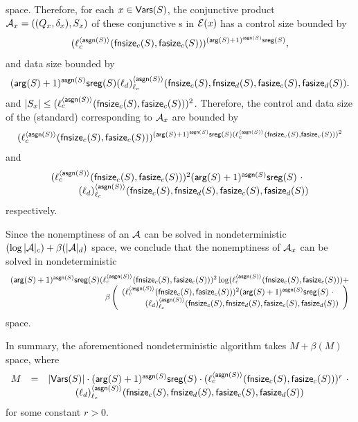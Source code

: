 \noindent space. 
Therefore, for each $x \in \mathsf{Vars}(S)$, the conjunctive product \SA{} $\mathcal{A}_x=((Q_x, \delta_x), S_x)$ of these conjunctive \SA{}s  in $\mathcal{E}(x)$ has a control size bounded by 
%
$$(\ell^{\langle \mathsf{asgn}(S) \rangle}_c(\mathsf{fnsize}_c(S), \mathsf{fasize}_c(S)))^{(\mathsf{arg}(S)+1)^{\mathsf{asgn}(S)} \mathsf{sreg}(S)},$$
%
and data size bounded by
%
\[ (\mathsf{arg}(S)+1)^{\mathsf{asgn}(S)} \mathsf{sreg}(S) (\ell_d)^{\langle  \mathsf{asgn}(S) \rangle}_{\ell_c}(\mathsf{fnsize}_c(S),\mathsf{fnsize}_d(S),  \mathsf{fasize}_c(S), \mathsf{fasize}_d(S)).\]
%
and $|S_x| \le (\ell_c^{\langle \mathsf{asgn}(S) \rangle}(\mathsf{fnsize}_c(S), \mathsf{fasize}_c(S)))^2$. 
Therefore, the control and data size of the (standard) \SA{} corresponding to $\mathcal{A}_x$ are  bounded by 
%
$$(\ell^{\langle \mathsf{asgn}(S) \rangle}_c(\mathsf{fnsize}_c(S), \mathsf{fasize}_c(S)))^{(\mathsf{arg}(S)+1)^{\mathsf{asgn}(S)} \mathsf{sreg}(S) (\ell_c^{\langle \mathsf{asgn}(S) \rangle}(\mathsf{fnsize}_c(S), \mathsf{fasize}_c(S)))^2}$$
%
and
$$
\begin{array}{l}
(\ell_c^{\langle \mathsf{asgn}(S) \rangle}(\mathsf{fnsize}_c(S), \mathsf{fasize}_c(S)))^2 (\mathsf{arg}(S)+1)^{\mathsf{asgn}(S)} \mathsf{sreg}(S)\ \cdot  \\
\hspace{1cm}(\ell_d)^{\langle  \mathsf{asgn}(S) \rangle}_{\ell_c}(\mathsf{fnsize}_c(S),\mathsf{fnsize}_d(S),  \mathsf{fasize}_c(S), \mathsf{fasize}_d(S))
\end{array}
$$
respectively.

Since the nonemptiness of an \SA{} $\mathcal{A}$ can be solved in nondeterministic $(\log |\mathcal{A}|_c) + \beta(|\mathcal{A}|_d)$ space, we conclude that the nonemptiness of $\mathcal{A}_x$ can be solved in nondeterministic 
{\small
$$
\begin{array}{l}
(\rcdim(S)+1)^{\rcdep(S)} \rcsreg(S) (\ell_c^{\langle \rcdep(S) \rangle}(\rcphi_c(S), \rcpsi_c(S)))^2 \log (\ell^{\langle \rcdep(S) \rangle}_c(\rcphi_c(S), \rcpsi_c(S)))+ \\
\hfill \beta
\left(
\begin{array}{l}
(\ell_c^{\langle \rcdep(S) \rangle}(\rcphi_c(S), \rcpsi_c(S)))^2 (\rcdim(S)+1)^{\rcdep(S)} \rcsreg(S)\ \cdot  \\
\hspace{1cm} (\ell_d)^{\langle  \rcdep(S) \rangle}_{\ell_c}(\rcphi_c(S),\rcphi_d(S),  \rcpsi_c(S), \rcpsi_d(S))
\end{array}
\right)
\end{array}
$$
}
space.

In summary, the aforementioned nondeterministic algorithm takes  $M + \beta(M)$ space, where 
%
$$
\begin{array}{l c l}
M & = & |\mathsf{Vars}(S)| \cdot (\mathsf{arg}(S)+1)^{\mathsf{asgn}(S)}  \mathsf{sreg}(S) \cdot  (\ell_c^{\langle \mathsf{asgn}(S) \rangle}(\mathsf{fnsize}_c(S), \mathsf{fasize}_c(S)))^{r}\ \cdot \\
& &  \hspace{1cm} (\ell_d)^{\langle  \mathsf{asgn}(S) \rangle}_{\ell_c}(\mathsf{fnsize}_c(S),\mathsf{fnsize}_d(S),  \mathsf{fasize}_c(S), \mathsf{fasize}_d(S))
\end{array}
$$
%
for some constant $r > 0$.


